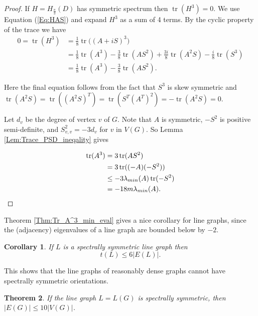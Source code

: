\documentclass[11pt]{article}
\theoremstyle{plain}
\newtheorem{theorem}{Theorem}[section]
\newtheorem{corollary}[theorem]{Corollary}
\DeclareMathOperator{\tr}{tr}
\newcommand{\ssym}[0]{spectrally symmetric }
\newcommand{\Hs}[0]{H_{\frac{\pi}{3}}}
\newcommand{\ssymend}[0]{spectrally symmetric}
\begin{document}
\begin{proof}
If $H=\Hs(D)$ has symmetric spectrum then $\tr(H^3)=0$. We use Equation (\ref{Eq:HAS}) and expand $H^3$ as a sum of 4 terms. By the cyclic property of the trace we have
\begin{align*}
0=\tr(H^3)&=\frac{1}{8}\tr\Big((A+iS)^3\Big)\\&=\frac{1}{8}\tr(A^3)-\frac{3}{8}\tr(AS^2)+\frac{3i}{8}\tr(A^2S)-\frac{i}{8}\tr(S^3)\\&=\frac{1}{8}\tr(A^3)-\frac{3}{8}\tr(AS^2).    
\end{align*}

Here the final equation follows from the fact that $S^3$ is skew symmetric and $\tr(A^2S)=\tr((A^2S)^T)=\tr(S^T(A^T)^2)=-\tr(A^2S)=0.$ 

Let $d_v$ be the degree of vertex $v$ of $G$. Note that $A$ is symmetric, $-S^2$ is positive semi-definite, and $S^2_{v,v}=-3d_v$ for $v$ in $V(G).$ So Lemma \ref{Lem:Trace_PSD_ineqality} gives  

\begin{align*}    
\tr(A^3)&=3\tr(AS^2)\\&=3\tr((-A)(-S^2))\\&\le-3\lambda_{min}(A)\tr(-S^2)\\&=-18m\lambda_{min}(A). \qedhere
\end{align*}

\end{proof}

Theorem \ref{Thm:Tr_A^3_min_eval} gives a nice corollary for line graphs, since the (adjacency) eigenvalues of a line graph are bounded below by $-2$.

\begin{corollary}\label{Cor:t<6e}
If $L$ is a \ssym line graph then
\[t(L)\le6|E(L)|.\]  
\end{corollary}

This shows that the line graphs of reasonably dense graphs cannot have spectrally symmetric orientations.

\begin{theorem}\label{Thm:10n}
    If the line graph $L=L(G)$ is \ssymend, then $|E(G)|\le10|V(G)|$.\end{theorem}
\end{document}
